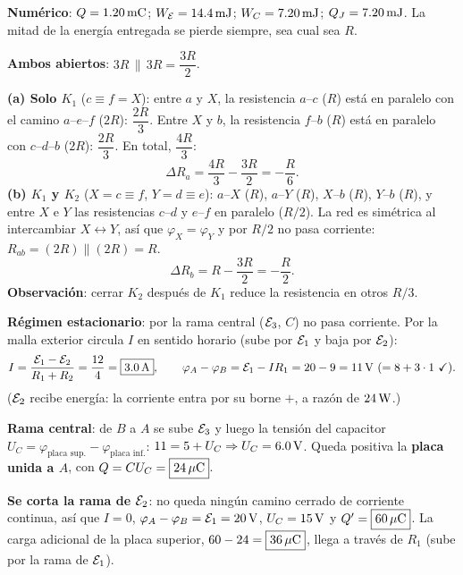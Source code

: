 \textbf{Numérico}: $Q=1.20\,\mathrm{mC}$; $W_{\mathcal{E}}=14.4\,\mathrm{mJ}$; $W_C=7.20\,\mathrm{mJ}$; $Q_J=7.20\,\mathrm{mJ}$. La mitad de la energía entregada se pierde siempre, sea cual sea $R$.

\begin{center}\circInterruptoresDos\end{center}
\textbf{Ambos abiertos}: $3R\,\|\,3R=\dfrac{3R}{2}$.

\textbf{(a) Solo $K_1$} ($c\equiv f=X$): entre $a$ y $X$, la resistencia $a$--$c$ ($R$) está en paralelo con el camino $a$--$e$--$f$ ($2R$): $\dfrac{2R}{3}$. Entre $X$ y $b$, la resistencia $f$--$b$ ($R$) está en paralelo con $c$--$d$--$b$ ($2R$): $\dfrac{2R}{3}$. En total, $\dfrac{4R}{3}$:
\[
\Delta R_a=\frac{4R}{3}-\frac{3R}{2}=\boxed{-\frac R6}.
\]
\textbf{(b) $K_1$ y $K_2$} ($X=c\equiv f$, $Y=d\equiv e$): $a$--$X$ ($R$), $a$--$Y$ ($R$), $X$--$b$ ($R$), $Y$--$b$ ($R$), y entre $X$ e $Y$ las resistencias $c$--$d$ y $e$--$f$ en paralelo ($R/2$). La red es simétrica al intercambiar $X\leftrightarrow Y$, así que $\varphi_X=\varphi_Y$ y por $R/2$ no pasa corriente: $R_{ab}=(2R)\|(2R)=R$.
\[
\Delta R_b=R-\frac{3R}{2}=\boxed{-\frac R2}.
\]
\textbf{Observación}: cerrar $K_2$ después de $K_1$ reduce la resistencia en otros $R/3$.

\begin{center}\circSdosCap\end{center}
\textbf{Régimen estacionario}: por la rama central ($\mathcal{E}_3$, $C$) no pasa corriente. Por la malla exterior circula $I$ en sentido horario (sube por $\mathcal{E}_1$ y baja por $\mathcal{E}_2$):
\[
I=\frac{\fem_1-\fem_2}{R_1+R_2}=\frac{12}{4}=\boxed{3.0\uu A},\qquad\varphi_A-\varphi_B=\fem_1-IR_1=20-9=11\uu V\ (=8+3\cdot1\ \checkmark).
\]
($\mathcal{E}_2$ recibe energía: la corriente entra por su borne $+$, a razón de $24\,\mathrm{W}$.)

\textbf{Rama central}: de $B$ a $A$ se sube $\mathcal{E}_3$ y luego la tensión del capacitor $U_C=\varphi_{\text{placa sup.}}-\varphi_{\text{placa inf.}}$: $11=5+U_C\Rightarrow U_C=6.0\,\mathrm{V}$. Queda positiva la \textbf{placa unida a $A$}, con $Q=CU_C=\boxed{24\,\mathrm{\mu C}}$.

\textbf{Se corta la rama de $\mathcal{E}_2$}: no queda ningún camino cerrado de corriente continua, así que $I=0$, $\varphi_A-\varphi_B=\mathcal{E}_1=20\,\mathrm{V}$, $U_C=15\,\mathrm{V}$ y $Q'=\boxed{60\,\mathrm{\mu C}}$. La carga adicional de la placa superior, $60-24=\boxed{36\,\mathrm{\mu C}}$, llega a través de $R_1$ (sube por la rama de $\mathcal{E}_1$).

